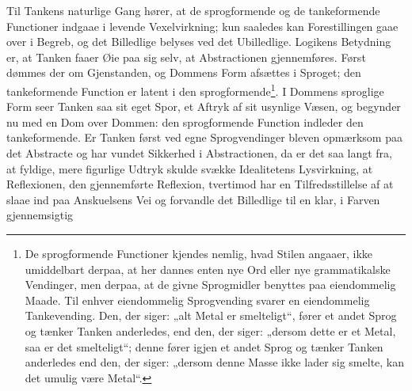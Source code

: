 \documentclass[12pt]{book}
\newcommand{\opage}[1]{\marginnote{\footnotesize\textit{[#1]}}}
\begin{document}
\opage{68}Til Tankens naturlige Gang hører, at de sprogformende og
de tankeformende Functioner indgaae i levende Vexelvirkning;
kun saaledes kan Forestillingen gaae over i Begreb, og det
Billedlige belyses ved det Ubilledlige. Logikens Betydning er,
at Tanken faaer Øie paa sig selv, at Abstractionen gjennemføres.
Først dømmes der om Gjenstanden, og Dommens
Form afsættes i Sproget; den tankeformende Function er
\opage{69}latent i den sprogformende\footnote{%
De sprogformende Functioner kjendes nemlig, hvad Stilen angaaer,
ikke umiddelbart derpaa, at her dannes enten nye Ord eller nye grammatikalske
Vendinger, men derpaa, at de givne Sprogmidler benyttes
paa eiendommelig Maade. Til enhver eiendommelig
Sprogvending svarer en eiendommelig Tankevending. Den, der
siger: „alt Metal er smelteligt“, fører et andet Sprog og tænker
Tanken anderledes, end den, der siger: „dersom dette er et Metal,
saa er det smelteligt“; denne fører igjen et andet Sprog og tænker
Tanken anderledes end den, der siger: „dersom denne Masse ikke
lader sig smelte, kan det umulig være Metal“.}. I Dommens sproglige Form
seer Tanken saa sit eget Spor, et Aftryk af sit usynlige Væsen,
og begynder nu med en Dom over Dommen: den sprogformende
Function indleder den tankeformende. Er Tanken først ved
egne Sprogvendinger bleven opmærksom paa det Abstracte og
har vundet Sikkerhed i Abstractionen, da er det saa langt fra,
at fyldige, mere figurlige Udtryk skulde svække Idealitetens Lysvirkning,
at Reflexionen, den gjennemførte Reflexion, tvertimod
har en Tilfredsstillelse af at slaae ind paa Anskuelsens Vei
og forvandle det Billedlige til en klar, i Farven gjennemsigtig
\end{document}
